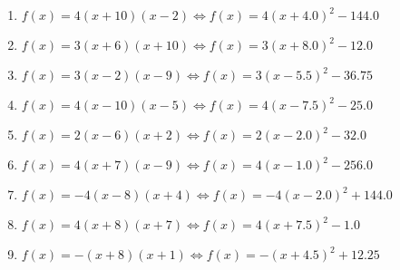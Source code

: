 \documentclass{article}%
\begin{document}
\begin{enumerate}[label=\alph*)]
\item%
\newline\vspace{0.5cm}$f(x)=4(x+10)(x-2)\Leftrightarrow f(x)=4(x+4.0)^2 -144.0$%
\item%
\newline\vspace{0.5cm}$f(x)=3(x+6)(x+10)\Leftrightarrow f(x)=3(x+8.0)^2 -12.0$%
\item%
\newline\vspace{0.5cm}$f(x)=3(x-2)(x-9)\Leftrightarrow f(x)=3(x-5.5)^2 -36.75$%
\item%
\newline\vspace{0.5cm}$f(x)=4(x-10)(x-5)\Leftrightarrow f(x)=4(x-7.5)^2 -25.0$%
\item%
\newline\vspace{0.5cm}$f(x)=2(x-6)(x+2)\Leftrightarrow f(x)=2(x-2.0)^2 -32.0$%
\item%
\newline\vspace{0.5cm}$f(x)=4(x+7)(x-9)\Leftrightarrow f(x)=4(x-1.0)^2 -256.0$%
\item%
\newline\vspace{0.5cm}$f(x)=-4(x-8)(x+4)\Leftrightarrow f(x)=-4(x-2.0)^2 +144.0$%
\item%
\newline\vspace{0.5cm}$f(x)=4(x+8)(x+7)\Leftrightarrow f(x)=4(x+7.5)^2 -1.0$%
\item%
\newline\vspace{0.5cm}$f(x)=-(x+8)(x+1)\Leftrightarrow f(x)=-(x+4.5)^2 +12.25$%
\end{enumerate}

%
\end{document}
